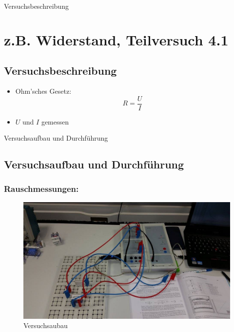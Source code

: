 \documentclass[11pt]{beamer}
\begin{document}


\begin{frame}{Versuchsbeschreibung}
\section{z.B. Widerstand, Teilversuch 4.1}
\subsection{Versuchsbeschreibung}
\begin{itemize}
\item Ohm'sches Gesetz:
\[R=\frac{U}{I}\]
\item $U$ und $I$ gemessen
\end{itemize}
\end{frame}
\begin{frame}{Versuchsaufbau und Durchführung}
\subsection{Versuchsaufbau und Durchführung}
\subsubsection*{Rauschmessungen:}
\begin{figure}
\centering
\includegraphics[scale=0.2]{12000155_1207085929316467_1534534399_n.jpg}
\caption{Versuchsaubau}
\end{figure}

\end{frame}
\end{document}
